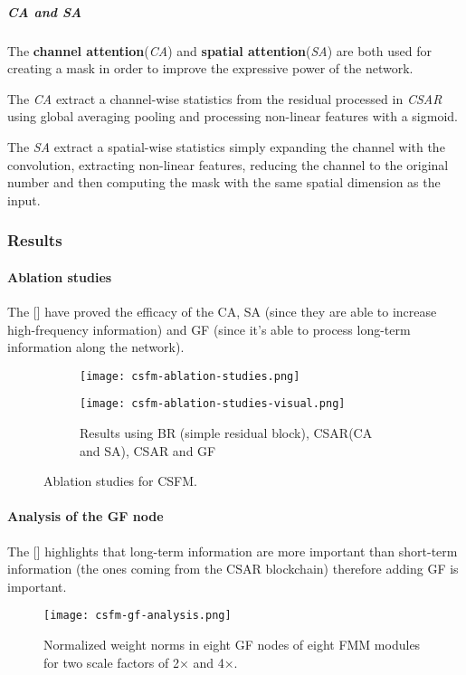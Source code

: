 \subparagraph{CA and SA}
The  \textbf{channel attention}(\textit{CA}) and \textbf{spatial attention}(\textit{SA}) are both used for creating a mask in order to improve the expressive power of the network.

The \textit{CA} extract a channel-wise statistics from the residual processed in \textit{CSAR} using global averaging pooling and processing non-linear features with a sigmoid.

The \textit{SA} extract a spatial-wise statistics simply expanding the channel with the convolution, extracting non-linear features, reducing the channel to the original number and then computing the mask with the same spatial dimension as the input.

\subsubsection{Results}

\paragraph{Ablation studies}
The [] have proved the efficacy of the CA, SA (since they are able to increase high-frequency information) and GF (since it's able to process long-term information along the network).
\begin{figure}[H]
    \begin{subfigure}{\textwidth}
        \centering
        \texttt{[image: csfm-ablation-studies.png]}
    \end{subfigure}
    \begin{subfigure}{\textwidth}
        \centering
        \texttt{[image: csfm-ablation-studies-visual.png]}    
        \caption{Results using BR (simple residual block), CSAR(CA and SA), CSAR and GF}
    \end{subfigure}    
    \caption{Ablation studies for CSFM.}\label{csfm:ablationstudies}
\end{figure}

\paragraph{Analysis of the GF node}
The [] highlights that long-term information are more important than short-term information (the ones coming from the CSAR blockchain) therefore adding GF is important.
\begin{figure}[H]
    \centering
    \texttt{[image: csfm-gf-analysis.png]}
    \caption{Normalized weight norms in eight GF nodes of eight FMM
    modules for two scale factors of 2× and 4×.}\label{csfm:gfstudy}
\end{figure}

